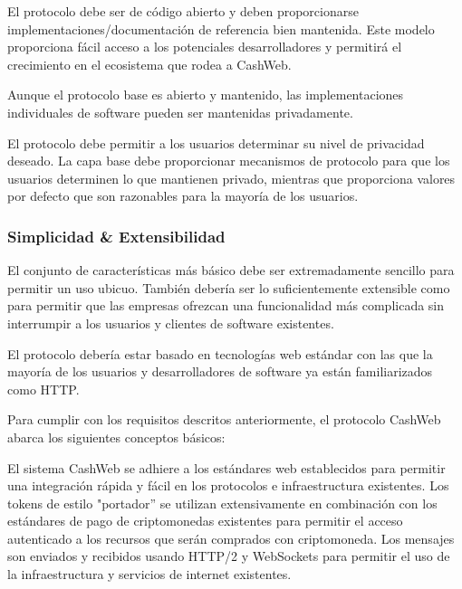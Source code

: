 \documentclass{article}
\begin{document}
El protocolo debe ser de código abierto y deben proporcionarse implementaciones/documentación de referencia bien mantenida. Este modelo proporciona fácil acceso a los potenciales desarrolladores y permitirá el crecimiento en el ecosistema que rodea a CashWeb.

Aunque el protocolo base es abierto y mantenido, las implementaciones individuales de software pueden ser mantenidas privadamente.


El protocolo debe permitir a los usuarios determinar su nivel de privacidad deseado. La capa base debe proporcionar mecanismos de protocolo para que los usuarios determinen lo que mantienen privado, mientras que proporciona valores por defecto que son razonables para la mayoría de los usuarios.

\subsubsection{Simplicidad \& Extensibilidad}

El conjunto de características más básico debe ser extremadamente sencillo para permitir un uso ubicuo. También debería ser lo suficientemente extensible como para permitir que las empresas ofrezcan una funcionalidad más complicada sin interrumpir a los usuarios y clientes de software existentes.


El protocolo debería estar basado en tecnologías web estándar con las que la mayoría de los usuarios y desarrolladores de software ya están familiarizados como HTTP.


Para cumplir con los requisitos descritos anteriormente, el protocolo CashWeb abarca los siguientes conceptos básicos:


El sistema CashWeb se adhiere a los estándares web establecidos para permitir una integración rápida y fácil en los protocolos e infraestructura existentes. Los tokens de estilo "portador'' se utilizan extensivamente en combinación con los estándares de pago de criptomonedas existentes para permitir el acceso autenticado a los recursos que serán comprados con criptomoneda. Los mensajes son enviados y recibidos usando HTTP/2\supercite{rfc7540} y WebSockets\supercite{rfc6455} para permitir el uso de la infraestructura y servicios de internet existentes.
\end{document}
